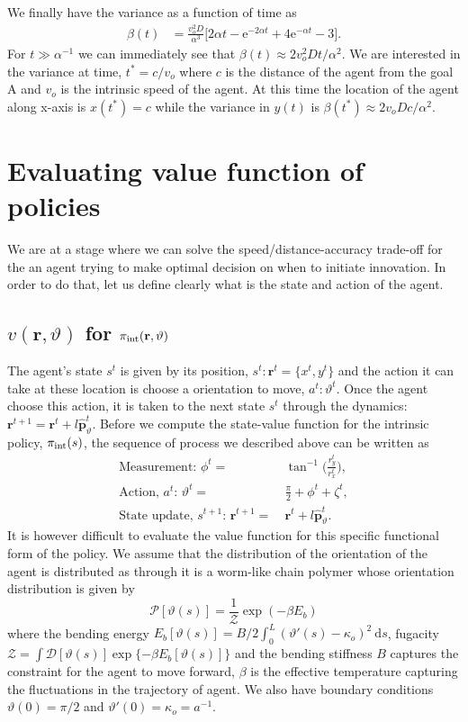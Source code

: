 \documentclass[12pt]{article}
\def\d{\text{d}}
\def\e{\text{e}}
\def\r{\mathbf{r}}
\def\ph{\hat{\mathbf{p}}}
\def\yd{\dot{y}}
\def\P{\mathcal{P}}
\def\theta{\vartheta}
\begin{document}
We finally have the variance as a function of time as
\begin{align}
    \beta(t) & = \frac{v_o^2 D}{\alpha^3} \bigg[ 2 \alpha t - \e^{-2 \alpha t} + 4 \e^{-\alpha t} - 3 \bigg].
\end{align}
For $t \gg \alpha^{-1}$ we can immediately see that $\beta(t) \approx 2v_o^2 D t/\alpha^2$. We are interested
in the variance at time, $t^* = c/v_o$ where $c$ is the distance of the agent from the goal A and $v_o$
is the intrinsic speed of the agent. At this time the location of the agent along x-axis is $x(t^*)=c$
while the variance in $y(t)$ is $\beta(t^*) \approx 2v_o D c/\alpha^2$.

\section{Evaluating value function of policies}
We are at a stage where we can solve the speed/distance-accuracy trade-off for the an agent trying
to make optimal decision on when to initiate innovation. In order to do that, let us define clearly
what is the state and action of the agent.
\subsection{$v(\r, \theta)$ for $\pi_{\rm int}(\r, \theta)$}
The agent's state $s^t$ is given by its position, $s^t: \r^t=\{ x^t, y^t \}$ and the action it can take
at these location is choose a orientation to move, $a^t: \theta^t$. Once the agent choose this action,
it is taken to the next state $s^t$ through the dynamics: $\r^{t+1} = \r^t + l \ph_\theta^{t}$.
Before we compute the state-value function for the intrinsic policy, $\pi_{\rm int}(s)$, the sequence
of process we described above can be written as
\begin{align}
    \text{Measurement: } \phi^{t} = & \ \tan^{-1} \bigg( \frac{r_y^t}{r_x^t} \bigg), \\
    \text{Action, $a^t$: }\theta^{t} =& \ \frac{\pi}{2} + \phi^{t} + \zeta^t, \\
    \text{State update, $s^{t+1}$: } \r^{t+1} =& \ \r^t + l \ph_\theta^{t}.
\end{align}
It is however difficult to evaluate the value function for this specific functional form of the policy.
We assume that the distribution of the orientation of the agent is distributed as through
it is a worm-like chain polymer whose orientation distribution is given by
\[
    \P[\theta(s)] = \frac{1}{\mathcal{Z}}\exp{(-\beta E_b)}
\]
where the bending energy $E_b[\theta(s)] = B/2 \int_0^L (\theta'(s)-\kappa_o)^2 \ \d s$, fugacity
$\mathcal{Z} = \int \mathcal{D}[\theta(s)] \exp\{ {-\beta E_b[\theta(s)]} \}$ and the bending
stiffness $B$ captures the constraint for the agent to move forward, $\beta$ is the effective
temperature capturing the fluctuations in the trajectory of agent. We also have
boundary conditions $\theta(0) = \pi/2$ and $\theta'(0) = \kappa_o = a^{-1}$. 
\end{document}
